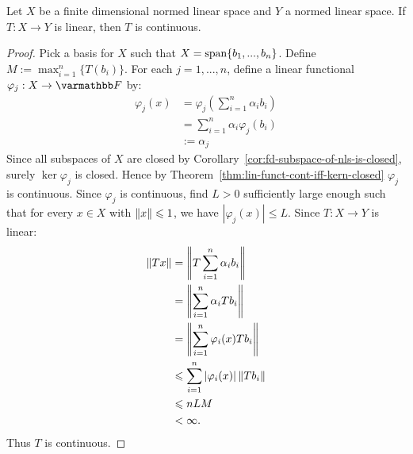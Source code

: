 \begin{theorem}\label{thm:fdnls-lin-implies-cont}
Let $X$ be a finite dimensional normed linear space and $Y$ a normed linear space. If $T:X \rightarrow Y$ is linear, then $T$ is continuous.
\end{theorem}
    \begin{proof}
        Pick a basis for $X$ such that $X = \operatorname{span}\{b_1,...,b_n\}$. Define $M:= \max_{i = 1}^n \{T(b_i)\}$. For each $j = 1,...,n$, define a linear functional $\varphi_j:X \rightarrow \bfF$ by:
            \begin{equation*}
            \begin{split}
                \varphi_j(x)
                & = \varphi_j \left( \sum_{i = 1}^n \alpha_i b_i \right) \\
                & = \sum_{i = 1}^n \alpha_i \varphi_j(b_i) \\
                & := \alpha_j
            \end{split}
            \end{equation*}
        Since all subspaces of $X$ are closed by Corollary~\ref{cor:fd-subspace-of-nls-is-closed}, surely $\ker \varphi_j$ is closed. Hence by Theorem~\ref{thm:lin-funct-cont-iff-kern-closed} $\varphi_j$ is continuous. Since $\varphi_j$ is continuous, find $L > 0$ sufficiently large enough such that for every $x \in X$ with $\left\lVert x \right\rVert \leqslant 1$, we have $|\varphi_j(x)| \leq L$. Since $T:X \rightarrow Y$ is linear:
            \begin{equation*}
            \begin{split}
                \left\lVert Tx \right\rVert
                & = \left\lVert T \sum_{i = 1}^n \alpha_i b_i \right\rVert \\
                & = \left\lVert \sum_{i = 1}^n \alpha_i T b_i \right\rVert \\
                & = \left\lVert \sum_{i = 1}^n \varphi_i(x) T b_i \right\rVert \\
                & \leqslant \sum_{i = 1}^n |\varphi_i(x)| \left\lVert T b_i \right\rVert \\
                & \leqslant nLM \\
                & < \infty.
            \end{split}
            \end{equation*}
        Thus $T$ is continuous.
    \end{proof}

